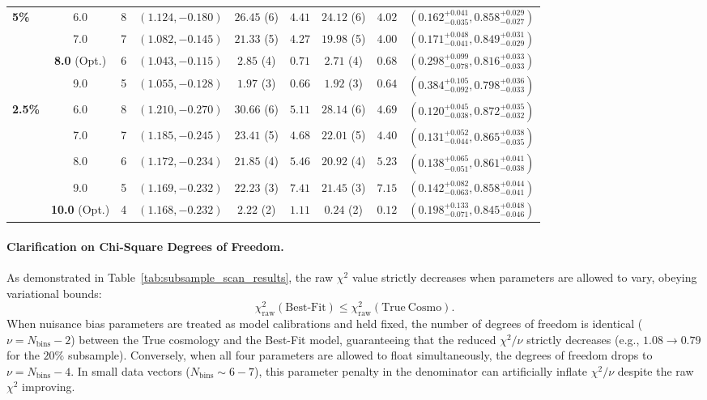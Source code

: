 \documentclass[12pt]{report}
\begin{document}
\begin{table}[H]
\begin{tabular}{lcccccccc}
        \midrule
        \textbf{5\%} 
        & 6.0 & 8 & $(1.124, -0.180)$ & $26.45$ (6) & $4.41$ & $24.12$ (6) & $4.02$ & $(0.162^{+0.041}_{-0.035}, 0.858^{+0.029}_{-0.027})$ \\
        & 7.0 & 7 & $(1.082, -0.145)$ & $21.33$ (5) & $4.27$ & $19.98$ (5) & $4.00$ & $(0.171^{+0.048}_{-0.041}, 0.849^{+0.031}_{-0.029})$ \\
        & \textbf{8.0} (Opt.) & 6 & $(1.043, -0.115)$ & $2.85$ (4) & $\mathbf{0.71}$ & $2.71$ (4) & $\mathbf{0.68}$ & $\mathbf{(0.298^{+0.099}_{-0.078}, 0.816^{+0.033}_{-0.033})}$ \\
        & 9.0 & 5 & $(1.055, -0.128)$ & $1.97$ (3) & $0.66$ & $1.92$ (3) & $0.64$ & $(0.384^{+0.105}_{-0.092}, 0.798^{+0.036}_{-0.033})$ \\
        \midrule
        \textbf{2.5\%} 
        & 6.0 & 8 & $(1.210, -0.270)$ & $30.66$ (6) & $5.11$ & $28.14$ (6) & $4.69$ & $(0.120^{+0.045}_{-0.038}, 0.872^{+0.035}_{-0.032})$ \\
        & 7.0 & 7 & $(1.185, -0.245)$ & $23.41$ (5) & $4.68$ & $22.01$ (5) & $4.40$ & $(0.131^{+0.052}_{-0.044}, 0.865^{+0.038}_{-0.035})$ \\
        & 8.0 & 6 & $(1.172, -0.234)$ & $21.85$ (4) & $5.46$ & $20.92$ (4) & $5.23$ & $(0.138^{+0.065}_{-0.051}, 0.861^{+0.041}_{-0.038})$ \\
        & 9.0 & 5 & $(1.169, -0.232)$ & $22.23$ (3) & $7.41$ & $21.45$ (3) & $7.15$ & $(0.142^{+0.082}_{-0.063}, 0.858^{+0.044}_{-0.041})$ \\
        & \textbf{10.0} (Opt.) & 4 & $(1.168, -0.232)$ & $2.22$ (2) & $\mathbf{1.11}$ & $0.24$ (2) & $\mathbf{0.12}$ & $\mathbf{(0.198^{+0.133}_{-0.071}, 0.845^{+0.048}_{-0.046})}$ \\
        \bottomrule
    \end{tabular}
\end{table}

\paragraph{Clarification on Chi-Square Degrees of Freedom.}
As demonstrated in Table~\ref{tab:subsample_scan_results}, the raw $\chi^2$ value strictly decreases when parameters are allowed to vary, obeying variational bounds:
\begin{equation}
    \chi^2_{\mathrm{raw}}(\mathrm{Best}\text{-}\mathrm{Fit}) \le \chi^2_{\mathrm{raw}}(\mathrm{True\ Cosmo}).
\end{equation}
When nuisance bias parameters are treated as model calibrations and held fixed, the number of degrees of freedom is identical ($\nu = N_{\mathrm{bins}} - 2$) between the True cosmology and the Best-Fit model, guaranteeing that the reduced $\chi^2/\nu$ strictly decreases (e.g., $1.08 \rightarrow 0.79$ for the $20\%$ subsample). Conversely, when all four parameters are allowed to float simultaneously, the degrees of freedom drops to $\nu = N_{\mathrm{bins}} - 4$. In small data vectors ($N_{\mathrm{bins}} \sim 6 - 7$), this parameter penalty in the denominator can artificially inflate $\chi^2/\nu$ despite the raw $\chi^2$ improving.
\end{document}

